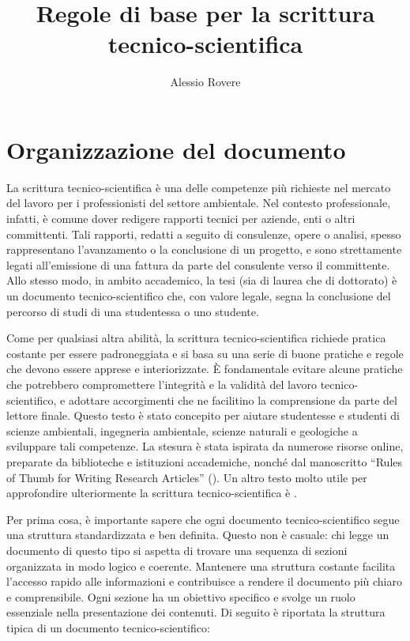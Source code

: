 \documentclass[9pt,a4paper,twoside]{rho-class/rho}
\title{Regole di base per la scrittura tecnico-scientifica}
\author[1]{Alessio Rovere}
\affil[1]{DAIS, Università Ca' Foscari di Venezia}
\begin{document}
    \maketitle
    \thispagestyle{firststyle}

\section{Organizzazione del documento}
La scrittura tecnico-scientifica è una delle competenze più richieste nel mercato del lavoro per i professionisti del settore ambientale. Nel contesto professionale, infatti, è comune dover redigere rapporti tecnici per aziende, enti o altri committenti. Tali rapporti, redatti a seguito di consulenze, opere o analisi, spesso rappresentano l’avanzamento o la conclusione di un progetto, e sono strettamente legati all’emissione di una fattura da parte del consulente verso il committente. Allo stesso modo, in ambito accademico, la tesi (sia di laurea che di dottorato) è un documento tecnico-scientifico che, con valore legale, segna la conclusione del percorso di studi di una studentessa o uno studente.

Come per qualsiasi altra abilità, la scrittura tecnico-scientifica richiede pratica costante per essere padroneggiata e si basa su una serie di buone pratiche e regole che devono essere apprese e interiorizzate. È fondamentale evitare alcune pratiche che potrebbero compromettere l’integrità e la validità del lavoro tecnico-scientifico, e adottare accorgimenti che ne facilitino la comprensione da parte del lettore finale. Questo testo è stato concepito per aiutare studentesse e studenti di scienze ambientali, ingegneria ambientale, scienze naturali e geologiche a sviluppare tali competenze. La stesura è stata ispirata da numerose risorse online, preparate da biblioteche e istituzioni accademiche, nonché dal manoscritto “Rules of Thumb for Writing Research Articles” (\cite{hengl2002rules}). Un altro testo molto utile per approfondire ulteriormente la scrittura tecnico-scientifica è \textcite{boudouresque2017manuel}.

Per prima cosa, è importante sapere che ogni documento tecnico-scientifico segue una struttura standardizzata e ben definita. Questo non è casuale: chi legge un documento di questo tipo si aspetta di trovare una sequenza di sezioni organizzata in modo logico e coerente. Mantenere una struttura costante facilita l’accesso rapido alle informazioni e contribuisce a rendere il documento più chiaro e comprensibile. Ogni sezione ha un obiettivo specifico e svolge un ruolo essenziale nella presentazione dei contenuti. Di seguito è riportata la struttura tipica di un documento tecnico-scientifico:
\end{document}
